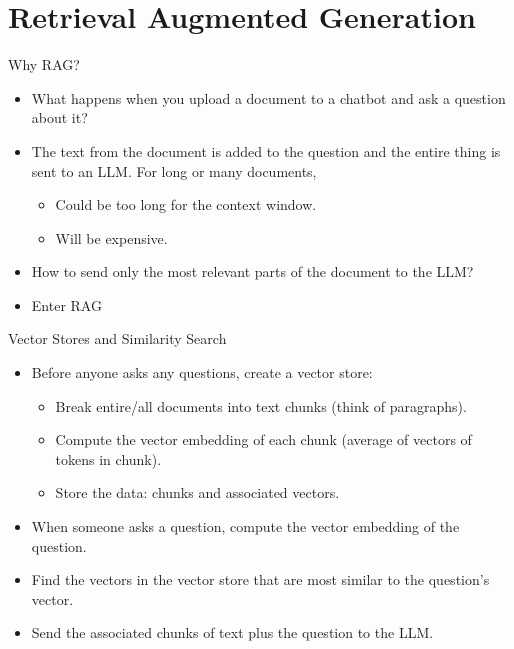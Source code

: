 \documentclass[10pt]{beamer}
\begin{document}
    \section{Retrieval Augmented Generation}

    \begin{frame}{Why RAG?}
        \begin{itemize}
        \item What happens when you upload a document to a chatbot and ask a question about it?
        \item The text from the document is added to the question and the entire thing is sent to an LLM.  For long or many documents,
        \begin{itemize}
        \item Could be too long for the context window.
        \item Will be expensive.
        \end{itemize}
    \item How to send only the most relevant parts of the document to the LLM?
    \item Enter RAG
        \end{itemize}
    \end{frame}

\begin{frame}{Vector Stores and Similarity Search}
    \begin{itemize}
    \item Before anyone asks any questions, create a vector store:
    \begin{itemize}
    \item 
   Break entire/all documents into text chunks (think of paragraphs).
    \item Compute the vector embedding of each chunk (average of vectors of tokens in chunk).
    \item Store the data: chunks and associated vectors.
    \end{itemize}
\item When someone asks a question, compute the vector embedding of the question.
\item Find the vectors in the vector store that are most similar to the question's vector.
\item Send the associated chunks of text plus the question to the LLM.
\end{itemize}
\end{frame}
\end{document}
